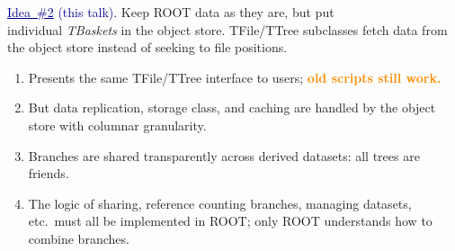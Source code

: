 \documentclass[aspectratio=169]{beamer}
\begin{document}
\begin{frame}{}
\vspace{1 cm}
\begin{center}
\Large \textcolor{darkblue}{\underline{Idea~\#2} (this talk).} Keep ROOT data as they are, but put \\ individual {\it TBaskets} in the object store. TFile/TTree subclasses fetch data from the object store instead of seeking to file positions.
\end{center}

\begin{enumerate}
\item<2-> Presents the same TFile/TTree interface to users; \textcolor{darkorange}{\bf old scripts still work.}
\item<3-> But data replication, storage class, and caching are handled by the object store with columnar granularity.
\item<4-> Branches are shared transparently across derived datasets: all trees are friends.
\item<5-> The logic of sharing, reference counting branches, managing datasets, etc.\ must all be implemented in ROOT; only ROOT understands how to combine branches.
\end{enumerate}

\begin{center}
\end{center}
\end{frame}
\end{document}
